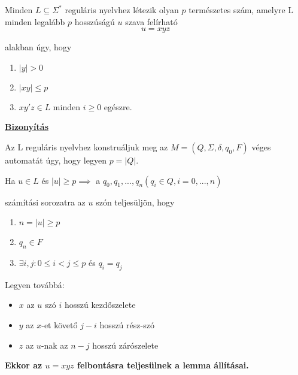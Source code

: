 \documentclass[10pt]{article}
\renewcommand{\\}{\par\noindent}
\begin{document}
\begin{frame}
\begin{tcolorbox}[title={Tétel: Pumpáló lemma reguláris nyelvre}]
Minden $L \subseteq {\Sigma}^*$ reguláris nyelvhez létezik olyan $p$ természetes szám, amelyre L minden legalább $p$ hosszúságú $u$ szava felírható $$u = xyz$$\\
alakban úgy, hogy\\
\begin{enumerate}
\item $|y| > 0$
\item $|xy| \leq p$
\item $xy'z \in L$ minden $i \geq 0$ egészre.
\end{enumerate}
\tcblower
\smallskip
\underline{\textbf{Bizonyítás}}\\
\medskip
\\
Az L reguláris nyelvhez konstruáljuk meg az $M = (Q, {\Sigma}, {\delta}, q_0, F)$ véges automatát úgy, hogy legyen $p = |Q|$.\\
Ha $u \in L$ és $|u| \geq p \implies$ a $q_0, q_1, ...,q_n (q_i \in Q, i = 0, ..., n)$\\
számítási sorozatra az $u$ szón teljesüljön, hogy\\
\begin{enumerate}
\item $n = |u| \geq p$
\item $q_n \in F$
\item ${\exists}i, j : 0 \leq i < j \leq p$ és $q_i = q_j$
\end{enumerate}
\bigskip
Legyen továbbá:
\begin{itemize}
\item $x$ az $u$ szó $i$ hosszú kezdőszelete
\item $y$ az $x$-et követő $j - i$ hosszú rész-szó
\item $z$ az $u$-nak az $n - j$ hosszú zárószelete 
\end{itemize}
\bigskip
\textbf{Ekkor az $u = xyz$ felbontásra teljesülnek a lemma állításai.}
\end{tcolorbox}

\end{frame}
\end{document}
